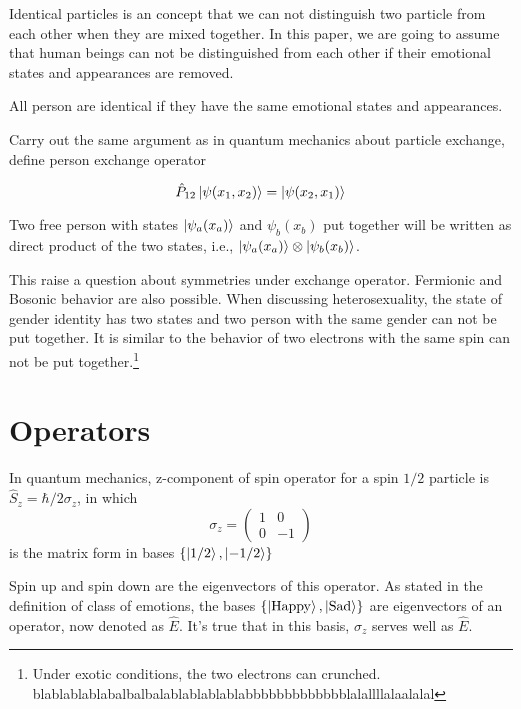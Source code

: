 \documentclass[%
 aip,
 jmp,%
 amsmath,amssymb,
 reprint,%
]{revtex4-1}
\begin{document}
Identical particles is an concept that we can not distinguish two particle from each other when they are mixed together. In this paper, we are going to assume that human beings can not be distinguished from each other if their emotional states and appearances are removed.

\begin{guess}
All person are identical if they have the same emotional states and appearances.
\end{guess}

Carry out the same argument as in quantum mechanics about particle exchange, define person exchange operator

\begin{equation}
\hat P_{12} \left| \psi(x_1,x_2)\right\rangle = \left| \psi(x_2,x_1)\right\rangle
\end{equation}

Two free person with states $\left| \psi_a(x_a)\right\rangle$ and $\psi_b(x_b)$ put together will be written as direct product of the two states, i.e., $\left| \psi_a(x_a)\right\rangle\otimes\left| \psi_b(x_b)\right\rangle$.

This raise a question about symmetries under exchange operator. Fermionic and Bosonic behavior are also possible. When discussing heterosexuality, the state of gender identity has two states and two person with the same gender can not be put together. It is similar to the behavior of two electrons with the same spin can not be put together.\footnote{Under exotic conditions, the two electrons can crunched. blablablablabalbalbalablablablablabbbbbbbbbbbbblalallllalaalalal}







\section{Operators}

In quantum mechanics, z-component of spin operator for a spin $1/2$ particle is $\hat S_z = \hbar/2\sigma_z$, in which
\begin{equation}
\sigma_z = \begin{pmatrix}1 & 0\\ 0 & -1\end{pmatrix}
\end{equation}
is the matrix form in bases $\{ \left| 1/2\right\rangle,\left| -1/2\right\rangle \}$

Spin up and spin down are the eigenvectors of this operator. As stated in the definition of class of emotions, the bases $\{\left| \mathrm {Happy}\right\rangle, \left| \mathrm{Sad}\right\rangle \}$ are eigenvectors of an operator, now denoted as $\hat E$. It's true that in this basis, $\sigma_z$ serves well as $\hat E$.
\end{document}
